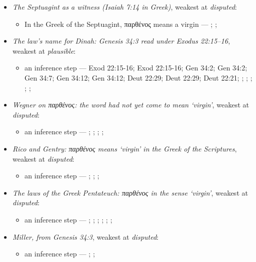 \documentclass[11pt]{article}
\begin{document}
\begin{itemize}
\item \emph{The Septuagint as a witness (Isaiah 7:14 in Greek)}, weakest at \emph{disputed}:
\begin{itemize}
\item In the Greek of the Septuagint, παρθένος means a virgin --- \cite[21]{rico-gentry-infant-king-2020}; \cite[113]{bratcher-study-of-isaiah-1958}; \cite[472]{postell-isaiah-messianic-2025}
\end{itemize}
\item \emph{The law’s name for Dinah: Genesis 34:3 read under Exodus 22:15–16}, weakest at \emph{plausible}:
\begin{itemize}
\item an inference step --- Exod 22:15-16; Exod 22:15-16; Gen 34:2; Gen 34:2; Gen 34:7; Gen 34:12; Gen 34:12; Deut 22:29; Deut 22:29; Deut 22:21; \cite[80, 91]{frymer-kensky-virginity-1998}; \cite[405--426]{enc-referential-analysis-1986}; \cite[18--21]{rico-gentry-infant-king-2020}; \cite[113]{bratcher-study-of-isaiah-1958}; \cite[483]{wegner-virgin-births-2011}; \cite[67]{rhodea-did-matthew-conceive-2013}
\end{itemize}
\item \emph{Wegner on παρθένος: the word had not yet come to mean ‘virgin’}, weakest at \emph{disputed}:
\begin{itemize}
\item an inference step --- \cite[482--483]{wegner-virgin-births-2011}; \cite[67]{rhodea-did-matthew-conceive-2013}; \cite{meade-ancient-versions-comment-2013}; \cite[18--21]{rico-gentry-infant-king-2020}; \cite[112--113]{bratcher-study-of-isaiah-1958}
\end{itemize}
\item \emph{Rico and Gentry: παρθένος means ‘virgin’ in the Greek of the Scriptures}, weakest at \emph{disputed}:
\begin{itemize}
\item an inference step --- \cite[21]{rico-gentry-infant-king-2020}; \cite[472]{postell-isaiah-messianic-2025}; \cite[456]{davidson-immanuel-1899}; \cite{meade-ancient-versions-comment-2013}
\end{itemize}
\item \emph{The laws of the Greek Pentateuch: παρθένος in the sense ‘virgin’}, weakest at \emph{disputed}:
\begin{itemize}
\item an inference step --- \cite[113]{bratcher-study-of-isaiah-1958}; \cite[102]{bratcher-study-of-isaiah-1958}; \cite[1339]{liddell-scott-jones-lexicon-1940}; \cite[535]{muraoka-lexicon-septuagint-2009}; \cite[s.v. παρθένια]{lust-lexicon-septuagint-2003}; \cite{miller-born-divine-2003}; \cite[67]{rhodea-did-matthew-conceive-2013}
\end{itemize}
\item \emph{Miller, from Genesis 34:3}, weakest at \emph{disputed}:
\begin{itemize}
\item an inference step --- \cite{miller-born-divine-2003}; \cite[18--21]{rico-gentry-infant-king-2020}; \cite[113]{bratcher-study-of-isaiah-1958}
\end{itemize}
\end{itemize}
\end{document}
